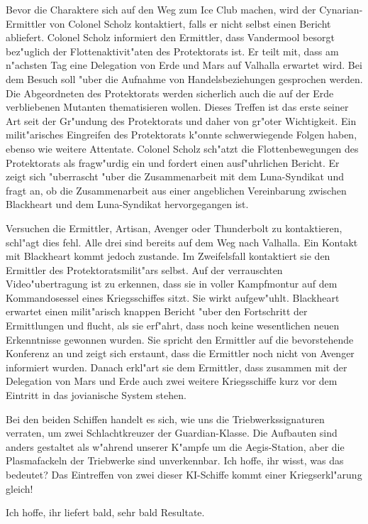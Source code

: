 Bevor die Charaktere sich auf den Weg zum Ice Club machen, wird der Cynarian-Ermittler von Colonel Scholz kontaktiert, falls er nicht selbst einen Bericht abliefert. Colonel Scholz informiert den Ermittler, dass Vandermool besorgt bez"uglich der Flottenaktivit"aten des Protektorats ist. Er teilt mit, dass am n"achsten Tag eine Delegation von Erde und Mars auf Valhalla erwartet wird. Bei dem Besuch soll "uber die Aufnahme von Handelsbeziehungen gesprochen werden. Die Abgeordneten des Protektorats werden sicherlich auch die auf der Erde verbliebenen Mutanten thematisieren wollen. Dieses Treffen ist das erste seiner Art seit der Gr"undung des Protektorats und daher von gr"o\3ter Wichtigkeit. Ein milit"arisches Eingreifen des Protektorats k"onnte schwerwiegende Folgen haben, ebenso wie weitere Attentate. Colonel Scholz sch"atzt die Flottenbewegungen des Protektorats als fragw"urdig ein und fordert einen ausf"uhrlichen Bericht. Er zeigt sich "uberrascht "uber die Zusammenarbeit mit dem Luna-Syndikat und fragt an, ob die Zusammenarbeit aus einer angeblichen Vereinbarung zwischen Blackheart und dem Luna-Syndikat hervorgegangen ist.


Versuchen die Ermittler, Artisan, Avenger oder Thunderbolt zu kontaktieren, schl"agt dies fehl. Alle drei sind bereits auf dem Weg nach Valhalla. Ein Kontakt mit Blackheart kommt jedoch zustande. Im Zweifelsfall kontaktiert sie den Ermittler des Protektoratsmilit"ars selbst. Auf der verrauschten Video"ubertragung ist zu erkennen, dass sie in voller Kampfmontur auf dem Kommandosessel eines Kriegsschiffes sitzt. Sie wirkt aufgew"uhlt. Blackheart erwartet einen milit"arisch knappen Bericht "uber den Fortschritt der Ermittlungen und flucht, als sie erf"ahrt, dass noch keine wesentlichen neuen Erkenntnisse gewonnen wurden. Sie spricht den Ermittler auf die bevorstehende Konferenz an und zeigt sich erstaunt, dass die Ermittler noch nicht von Avenger informiert wurden. Danach erkl"art sie dem Ermittler, dass zusammen mit der Delegation von Mars und Erde auch zwei weitere Kriegsschiffe kurz vor dem Eintritt in das jovianische System stehen.

\begin{speech}
	Bei den beiden Schiffen handelt es sich, wie uns die Triebwerkssignaturen verraten, um zwei Schlachtkreuzer der Guardian-Klasse. Die Aufbauten sind anders gestaltet als w"ahrend unserer K"ampfe um die Aegis-Station, aber die Plasmafackeln der Triebwerke sind unverkennbar. Ich hoffe, ihr wisst, was das bedeutet? Das Eintreffen von zwei dieser KI-Schiffe kommt einer Kriegserkl"arung gleich!

	Ich hoffe, ihr liefert bald, sehr bald Resultate.
\end{speech}

